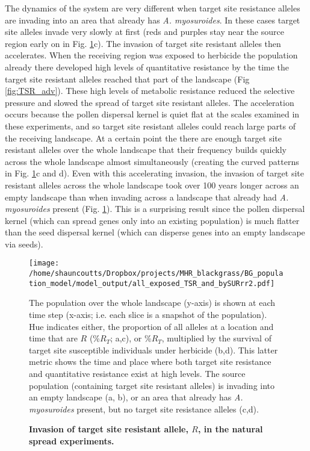 \documentclass[10pt,letterpaper]{article}
\begin{document}
The dynamics of the system are very different when target site resistance alleles are invading into an area that already has \textit{A. myosuroides}. In these cases target site alleles invade very slowly at first (reds and purples stay near the source region early on in Fig. \ref{fig:pro_R_natspr}c). The invasion of target site resistant alleles then accelerates. When the receiving region was exposed to herbicide the population already there developed high levels of quantitative resistance by the time the target site resistant alleles reached that part of the landscape (Fig \ref{fig:TSR_adv}). These high levels of metabolic resistance reduced the selective pressure and slowed the spread of target site resistant alleles. The acceleration occurs because the pollen dispersal kernel is quiet flat at the scales examined in these experiments, and so target site resistant alleles could reach large parts of the receiving landscape. At a certain point the there are enough target site resistant alleles over the whole landscape that their frequency builds quickly across the whole landscape almost simultaneously (creating the curved patterns in Fig. \ref{fig:pro_R_natspr}c and d). Even with this accelerating invasion, the invasion of target site resistant alleles across the whole landscape took over 100 years longer across an empty landscape than when invading across a landscape that already had \textit{A. myosuroides} present (Fig. \ref{fig:pro_R_natspr}). This is a surprising result since the pollen dispersal kernel (which can spread genes only into an existing population) is much flatter than the seed dispersal kernel (which can disperse genes into an empty landscape via seeds).         

\begin{figure}[!h] 
	\texttt{[image: /home/shauncoutts/Dropbox/projects/MHR\_blackgrass/BG\_population\_model/model\_output/all\_exposed\_TSR\_and\_bySURrr2.pdf]}
\caption{\bf Invasion of target site resistant allele, $R$, in the natural spread experiments.} The population over the whole landscape (y-axis) is shown at each time step (x-axis; i.e. each slice is a snapshot of the population). Hue indicates either, the proportion of all alleles at a location and time that are $R$ (\%$R_T$; a,c), or \%$R_T$, multiplied by the survival of target site susceptible individuals under herbicide (b,d). This latter metric shows the time and place where both target site resistance and quantitative resistance exist at high levels. The source population (containing target site resistant alleles) is invading into an empty landscape (a, b), or an area that already has \textit{A. myosuroides} present, but no target site resistance alleles (c,d). 
\label{fig:pro_R_natspr}
\end{figure}
\end{document}
